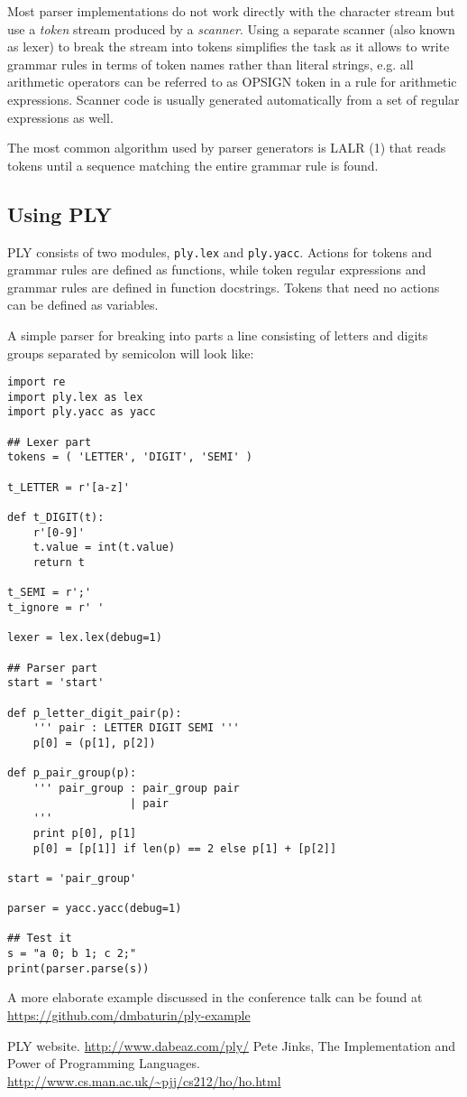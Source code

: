 \documentclass[10pt, a5paper]{article}
\begin{document}
Most parser implementations do not work directly with the character stream but use a \emph{token} stream produced by a \emph{scanner}. Using a separate scanner (also known as lexer) to break the stream into tokens simplifies the task as it allows to write grammar rules in terms of token names rather than literal strings, e.g. all arithmetic operators can be referred to as OPSIGN token in a rule for arithmetic expressions. Scanner code is usually generated automatically from a set of regular expressions as well.

The most common algorithm used by parser generators is LALR (1) that reads tokens until a sequence matching the entire grammar rule is found.

\subsection*{Using PLY}

PLY consists of two modules, \verb!ply.lex! and \verb!ply.yacc!. Actions for tokens and grammar rules are defined as functions, while token regular expressions and grammar rules are defined in function docstrings. \linebreak Tokens that need no actions can be defined as variables.

A simple parser for breaking into parts a line consisting of letters and digits groups separated by semicolon will look like:

\begin{verbatim}
import re
import ply.lex as lex
import ply.yacc as yacc

## Lexer part
tokens = ( 'LETTER', 'DIGIT', 'SEMI' )

t_LETTER = r'[a-z]'

def t_DIGIT(t):
    r'[0-9]'
    t.value = int(t.value)
    return t

t_SEMI = r';'
t_ignore = r' '

lexer = lex.lex(debug=1)

## Parser part
start = 'start'

def p_letter_digit_pair(p):
    ''' pair : LETTER DIGIT SEMI '''
    p[0] = (p[1], p[2])

def p_pair_group(p):
    ''' pair_group : pair_group pair
                   | pair
    '''
    print p[0], p[1]
    p[0] = [p[1]] if len(p) == 2 else p[1] + [p[2]]

start = 'pair_group'

parser = yacc.yacc(debug=1)

## Test it
s = "a 0; b 1; c 2;"
print(parser.parse(s))
\end{verbatim}

A more elaborate example discussed in the conference talk can be found at \url{https://github.com/dmbaturin/ply-example}


\begin{thebibliography}{9}
 PLY website. \url{http://www.dabeaz.com/ply/}
 Pete Jinks, The Implementation and Power of Programming Languages. \url{http://www.cs.man.ac.uk/~pjj/cs212/ho/ho.html}
\end{thebibliography}
\end{document}
